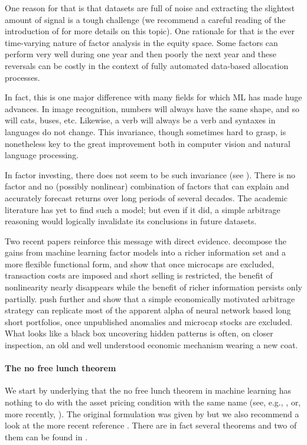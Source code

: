 One reason for that is that datasets are full of noise and extracting the slightest amount of signal is a tough challenge (we recommend a careful reading of the introduction of \cite{timmermann2018forecasting} for more details on this topic). One rationale for that is the ever time-varying nature of factor analysis in the equity space. Some factors can perform very well during one year and then poorly the next year and these reversals can be costly in the context of fully automated data-based allocation processes.

In fact, this is one major difference with many fields for which ML has made huge advances. In image recognition, numbers will always have the same shape, and so will cats, buses, etc. Likewise, a verb will always be a verb and syntaxes in languages do not change. This invariance, though sometimes hard to grasp, is nonetheless key to the great improvement both in computer vision and natural language processing.

In factor investing, there does not seem to be such invariance (see \cite{cornell2020stock}). There is no factor and no (possibly nonlinear) combination of factors that can explain and accurately forecast returns over long periods of several decades. The academic literature has yet to find such a model; but even if it did, a simple arbitrage reasoning would logically invalidate its conclusions in future datasets.

Two recent papers reinforce this message with direct evidence. \cite{esakia2025what} decompose the gains from machine learning factor models into a richer information set and a more flexible functional form, and show that once microcaps are excluded, transaction costs are imposed and short selling is restricted, the benefit of nonlinearity nearly disappears while the benefit of richer information persists only partially. \cite{lu2025machine} push further and show that a simple economically motivated arbitrage strategy can replicate most of the apparent alpha of neural network based long short portfolios, once unpublished anomalies and microcap stocks are excluded. What looks like a black box uncovering hidden patterns is often, on closer inspection, an old and well understood economic mechanism wearing a new coat.

\paragraph{The no free lunch theorem}

We start by underlying that the no free lunch theorem in machine learning has nothing to do with the asset pricing condition with the same name (see, e.g., \cite{delbaen1994general}, or, more recently, \cite{cuchiero2016new}). The original formulation was given by \cite{wolpert1992connection} but we also recommend a look at the more recent reference \cite{ho2002simple}. There are in fact several theorems and two of them can be found in \cite{wolpert1997no}.

